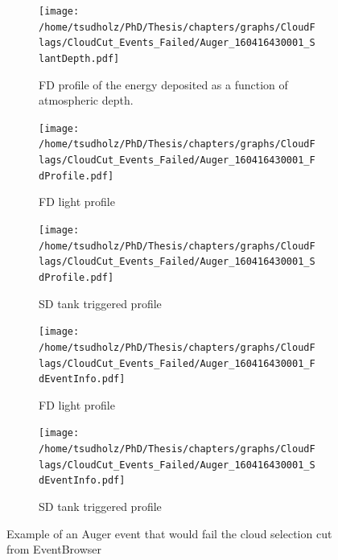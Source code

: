 \begin{figure}
\centering
 \vspace{2cm}
  \begin{subfigure}[b]{\textwidth}
  \centering
  \texttt{[image: /home/tsudholz/PhD/Thesis/chapters/graphs/CloudFlags/CloudCut\_Events\_Failed/Auger\_160416430001\_SlantDepth.pdf]}
  \caption{FD profile of the energy deposited as a function of atmospheric depth.}
  \end{subfigure}
 \vspace{0.5cm}
  \begin{subfigure}[b]{0.45\textwidth}
  	\centering
  	\texttt{[image: /home/tsudholz/PhD/Thesis/chapters/graphs/CloudFlags/CloudCut\_Events\_Failed/Auger\_160416430001\_FdProfile.pdf]}
  	\caption{FD light profile}
  \end{subfigure}
  \begin{subfigure}[b]{0.45\textwidth}
  	\centering
  	\texttt{[image: /home/tsudholz/PhD/Thesis/chapters/graphs/CloudFlags/CloudCut\_Events\_Failed/Auger\_160416430001\_SdProfile.pdf]}
  	\caption{SD tank triggered profile}
  \end{subfigure}

  \begin{subfigure}[b]{0.45\textwidth}
  	\centering
	\texttt{[image: /home/tsudholz/PhD/Thesis/chapters/graphs/CloudFlags/CloudCut\_Events\_Failed/Auger\_160416430001\_FdEventInfo.pdf]}
  	\caption{FD light profile}
  \end{subfigure}
  \begin{subfigure}[b]{0.45\textwidth}
  	\centering
	\texttt{[image: /home/tsudholz/PhD/Thesis/chapters/graphs/CloudFlags/CloudCut\_Events\_Failed/Auger\_160416430001\_SdEventInfo.pdf]}
  	\caption{SD tank triggered profile}
  \end{subfigure}
  \caption{Example of an Auger event that would fail the cloud selection cut from EventBrowser}
\end{figure}

